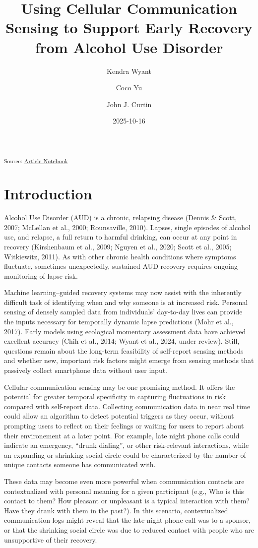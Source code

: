 \documentclass[
  letterpaper,
  DIV=11,
  numbers=noendperiod]{scrartcl}
\title{Using Cellular Communication Sensing to Support Early Recovery
from Alcohol Use Disorder}
\author{Kendra Wyant \and Coco Yu \and John J. Curtin}
\date{2025-10-16}
\begin{document}
\maketitle


\textsubscript{Source:
\href{https://jjcurtin.github.io/study_messages/index.qmd.html}{Article
Notebook}}

\section{Introduction}\label{introduction}

Alcohol Use Disorder (AUD) is a chronic, relapsing disease (Dennis \&
Scott, 2007; McLellan et al., 2000; Rounsaville, 2010). Lapses, single
episodes of alcohol use, and relapse, a full return to harmful drinking,
can occur at any point in recovery (Kirshenbaum et al., 2009; Nguyen et
al., 2020; Scott et al., 2005; Witkiewitz, 2011). As with other chronic
health conditions where symptoms fluctuate, sometimes unexpectedly,
sustained AUD recovery requires ongoing monitoring of lapse risk.

Machine learning--guided recovery systems may now assist with the
inherently difficult task of identifying when and why someone is at
increased risk. Personal sensing of densely sampled data from
individuals' day-to-day lives can provide the inputs necessary for
temporally dynamic lapse predictions (Mohr et al., 2017). Early models
using ecological momentary assessment data have achieved excellent
accuracy (Chih et al., 2014; Wyant et al., 2024, under review). Still,
questions remain about the long-term feasibility of self-report sensing
methods and whether new, important risk factors might emerge from
sensing methods that passively collect smartphone data without user
input.

Cellular communication sensing may be one promising method. It offers
the potential for greater temporal specificity in capturing fluctuations
in risk compared with self-report data. Collecting communication data in
near real time could allow an algorithm to detect potential triggers as
they occur, without prompting users to reflect on their feelings or
waiting for users to report about their environement at a later point.
For example, late night phone calls could indicate an emergency, ``drunk
dialing'', or other risk-relevant interactions, while an expanding or
shrinking social circle could be characterized by the number of unique
contacts someone has communicated with.

These data may become even more powerful when communication contacts are
contextualized with personal meaning for a given participant (e.g., Who
is this contact to them? How pleasant or unpleasant is a typical
interaction with them? Have they drank with them in the past?). In this
scenario, contextualized communication logs might reveal that the
late-night phone call was to a sponsor, or that the shrinking social
circle was due to reduced contact with people who are unsupportive of
their recovery.
\end{document}
